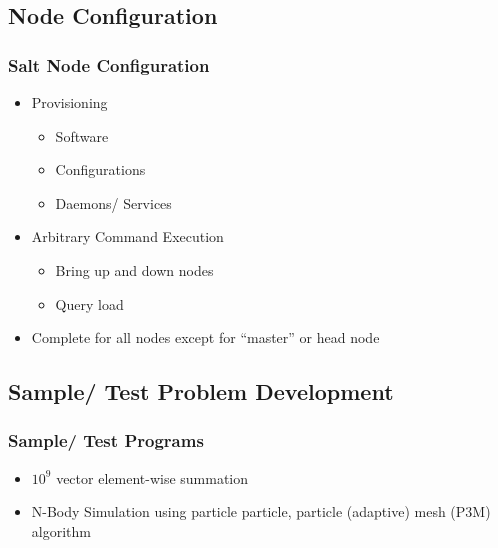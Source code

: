 \documentclass{beamer}
\begin{document}
\subsection{Node Configuration}
\begin{frame}
\frametitle{Salt Node Configuration}
\begin{itemize}
\item{Provisioning}
\begin{itemize}
\item{Software}
\item{Configurations}
\item{Daemons/ Services}
\end{itemize}
\item{Arbitrary Command Execution}
\begin{itemize}
\item{Bring up and down nodes}
\item{Query load}
\end{itemize}
\item{Complete for all nodes except for ``master'' or head node}
\end{itemize}
\end{frame}
\subsection{Sample/ Test Problem Development}
\begin{frame}
\frametitle{Sample/ Test Programs}
\begin{itemize}
\item{$ 10^{9} $ vector element-wise summation}
\item{N-Body Simulation using particle particle, particle (adaptive) mesh (P3M)
      algorithm}
\end{itemize}
\end{frame}
\end{document}
